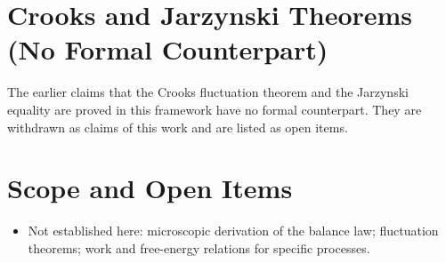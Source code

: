 \documentclass[11pt, a4paper]{article}
\begin{document}
\section{Crooks and Jarzynski Theorems (No Formal Counterpart)}
The earlier claims that the Crooks fluctuation theorem and the Jarzynski equality are proved in this framework have no formal counterpart. They are withdrawn as claims of this work and are listed as open items.

\section{Scope and Open Items}
\begin{itemize}
  \item Not established here: microscopic derivation of the balance law; fluctuation theorems; work and free-energy relations for specific processes.
\end{itemize}
\end{document}
